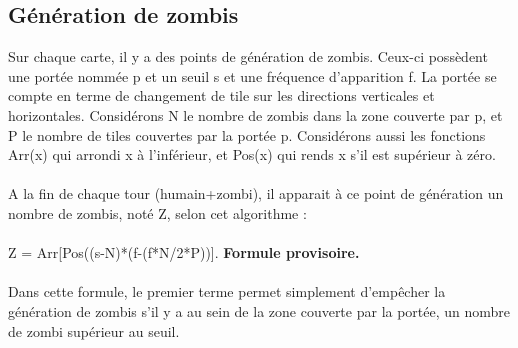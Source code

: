 \subsection{Génération de zombis}
Sur chaque carte, il y a des points de génération de zombis. Ceux-ci possèdent une portée nommée p et un seuil s et une fréquence d'apparition f. La portée se compte en terme de changement de tile sur les directions verticales et horizontales. Considérons N le nombre de zombis dans la zone couverte par p, et P le nombre de tiles couvertes par la portée p. Considérons aussi les fonctions Arr(x) qui arrondi x à l'inférieur, et Pos(x) qui rends x s'il est supérieur à zéro.
\\\\
A la fin de chaque tour (humain+zombi), il apparait à ce point de génération un nombre de zombis, noté Z, selon cet algorithme :\\\\
Z = Arr[Pos((s-N)*(f-(f*N/2*P))].
\textbf{Formule provisoire.}\\\\
Dans cette formule, le premier terme permet simplement d'empêcher la génération de zombis s'il y a au sein de la zone couverte par la portée, un nombre de zombi supérieur au seuil.
